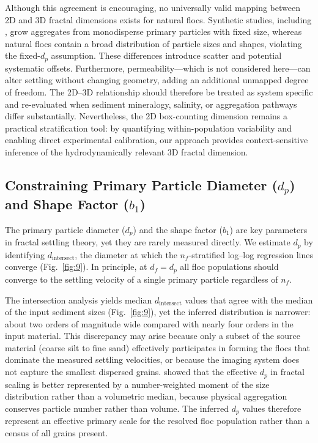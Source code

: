\documentclass{agujournal2019}
\begin{document}
Although this agreement is encouraging, no universally valid mapping between 2D and 3D fractal dimensions exists for natural flocs. Synthetic studies, including , grow aggregates from monodisperse primary particles with fixed size, whereas natural flocs contain a broad distribution of particle sizes and shapes, violating the fixed-$d_p$ assumption. These differences introduce scatter and potential systematic offsets. Furthermore, permeability---which is not considered here---can alter settling without changing geometry, adding an additional unmapped degree of freedom. The 2D--3D relationship should therefore be treated as system specific and re-evaluated when sediment mineralogy, salinity, or aggregation pathways differ substantially. Nevertheless, the 2D box-counting dimension remains a practical stratification tool: by quantifying within-population variability and enabling direct experimental calibration, our approach provides context-sensitive inference of the hydrodynamically relevant 3D fractal dimension.

\subsection{Constraining Primary Particle Diameter ($d_p$) and Shape Factor ($b_1$)}

The primary particle diameter ($d_p$) and the shape factor ($b_1$) are key parameters in fractal settling theory, yet they are rarely measured directly. We estimate $d_p$ by identifying $d_\text{intersect}$, the diameter at which the $n_f$-stratified log--log regression lines converge (Fig.~\ref{fig:9}). In principle, at $d_f = d_p$ all floc populations should converge to the settling velocity of a single primary particle regardless of $n_f$.

The intersection analysis yields median $d_\text{intersect}$ values that agree with the median of the input sediment sizes (Fig.~\ref{fig:9}), yet the inferred distribution is narrower: about two orders of magnitude wide compared with nearly four orders in the input material. This discrepancy may arise because only a subset of the source material (coarse silt to fine sand) effectively participates in forming the flocs that dominate the measured settling velocities, or because the imaging system does not capture the smallest dispersed grains.  showed that the effective $d_p$ in fractal scaling is better represented by a number-weighted moment of the size distribution rather than a volumetric median, because physical aggregation conserves particle number rather than volume. The inferred $d_p$ values therefore represent an effective primary scale for the resolved floc population rather than a census of all grains present.
\end{document}
